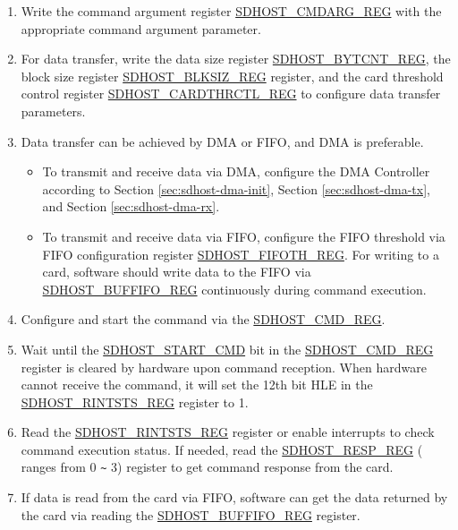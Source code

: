 \documentclass[main\_\_EN.tex]{subfiles}
\begin{document}
\begin{enumerate}
\item Write the command argument register \hyperref[fielddesc:SDHOSTCMDARGREG]{\hyperref[regdesc:SDHOSTCMDARGREG]{SDHOST\_CMDARG\_REG}} with the appropriate command argument parameter.
\item For data transfer, write the data size register \hyperref[regdesc:SDHOSTBYTCNTREG]{SDHOST\_BYTCNT\_REG}, the block size register \hyperref[regdesc:SDHOSTBLKSIZREG]{SDHOST\_BLKSIZ\_REG} register, and the card threshold control register \hyperref[regdesc:SDHOSTCARDTHRCTLREG]{SDHOST\_CARDTHRCTL\_REG} to configure data transfer parameters.
\item Data transfer can be achieved by DMA or FIFO, and DMA is preferable. 
\begin{itemize}
    \item To transmit and receive data via DMA, configure the DMA Controller according to Section \ref{sec:sdhost-dma-init}, Section \ref{sec:sdhost-dma-tx}, and Section \ref{sec:sdhost-dma-rx}.
    \item To transmit and receive data via FIFO, configure the FIFO threshold via FIFO configuration register \hyperref[regdesc:SDHOSTFIFOTHREG]{SDHOST\_FIFOTH\_REG}. For writing to a card, software should write data to the FIFO via \hyperref[fielddesc:SDHOSTBUFFIFOREG]{\hyperref[regdesc:SDHOSTBUFFIFOREG]{SDHOST\_BUFFIFO\_REG}} continuously during command execution.
\end{itemize}
\item Configure and start the command via the \hyperref[regdesc:SDHOSTCMDREG]{SDHOST\_CMD\_REG}.
\item Wait until the \hyperref[fielddesc:SDHOSTSTARTCMD]{SDHOST\_START\_CMD} bit in the \hyperref[regdesc:SDHOSTCMDREG]{SDHOST\_CMD\_REG} register is cleared by hardware upon command reception. When hardware cannot receive the command, it will set the 12th bit HLE in the \hyperref[regdesc:SDHOSTRINTSTSREG]{SDHOST\_RINTSTS\_REG} register to 1.
\item Read the \hyperref[regdesc:SDHOSTRINTSTSREG]{SDHOST\_RINTSTS\_REG} register or enable interrupts to check command execution status. If needed, read the  \hyperref[regdesc:SDHOSTRESP0REG]{SDHOST\_RESP\_REG} ( ranges from 0 \verb+~+ 3) register to get command response from the card.
\item If data is read from the card via FIFO, software can get the data returned by the card via reading the \hyperref[fielddesc:SDHOSTBUFFIFOREG]{\hyperref[regdesc:SDHOSTBUFFIFOREG]{SDHOST\_BUFFIFO\_REG}} register.
\end{enumerate}
\end{document}
